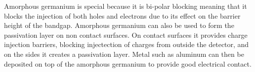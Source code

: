 Amorphous germanium is special because it is bi-polar blocking meaning that it blocks the injection of both holes and electrons due to its effect on the barrier height of the bandgap.
Amorphous germanium can also be used to form the passivation layer on non contact surfaces.
On contact surfaces it provides charge injection barriers, blocking injectection of charges from outside the detector, and on the sides it creates a passivation layer. 
Metal such as aluminum can then be deposited on top of the amorphous germanium to provide good electrical contact.

